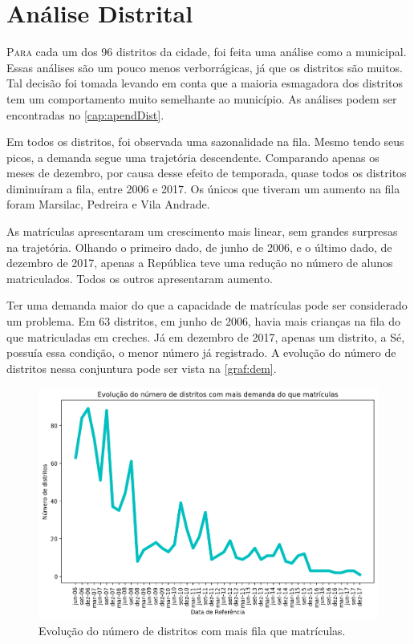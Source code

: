 \chapter{Análise Distrital}
\label{cap:dist}

\lettrine{P}{ara} cada um dos 96 distritos da cidade, foi feita uma análise como a municipal. Essas análises são um pouco menos verborrágicas, já que os distritos são muitos. Tal decisão foi tomada levando em conta que a maioria esmagadora dos distritos tem um comportamento muito semelhante ao município. As análises podem ser encontradas no \autoref{cap:apendDist}.

Em todos os distritos, foi observada uma sazonalidade na fila. Mesmo tendo seus picos, a demanda segue uma trajetória descendente. Comparando apenas os meses de dezembro, por causa desse efeito de temporada, quase todos os distritos diminuíram a fila, entre 2006 e 2017. Os únicos que tiveram um aumento na fila foram Marsilac, Pedreira e Vila Andrade.

As matrículas apresentaram um crescimento mais linear, sem grandes surpresas na trajetória. Olhando o primeiro dado, de junho de 2006, e o último dado, de dezembro de 2017, apenas a República teve uma redução no número de alunos matriculados. Todos os outros apresentaram aumento.

Ter uma demanda maior do que a capacidade de matrículas pode ser considerado um problema. Em 63 distritos, em junho de 2006, havia mais crianças na fila do que matriculadas em creches. Já em dezembro de 2017, apenas um distrito, a Sé, possuía essa condição, o menor número já registrado. A evolução do número de distritos nessa conjuntura pode ser vista na \autoref{graf:dem}.

\begin{figure}
	\centering
	\includegraphics[width=.8\linewidth]{grafdem}
	\caption{Evolução do número de distritos com mais fila que matrículas.}
	\label{graf:dem}
\end{figure}

